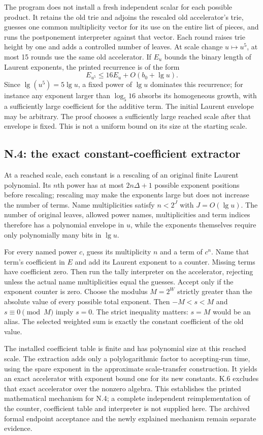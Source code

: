 \documentclass[11pt,letterpaper]{article}
\theoremstyle{definition}\newtheorem{definition}[theorem]{Definition}\newtheorem{example}[theorem]{Example}
\theoremstyle{remark}\newtheorem{remark}[theorem]{Remark}
\begin{document}
The program does not install a fresh independent scalar for each possible product. It retains the old trie and adjoins the rescaled old accelerator's trie, guesses one common multiplicity vector for its use on the entire list of pieces, and runs the postponement interpreter against that vector. Each round raises trie height by one and adds a controlled number of leaves. At scale change $u\mapsto u^5$, at most 15 rounds use the same old accelerator. If $E_u$ bounds the binary length of Laurent exponents, the printed recurrence is of the form
\[
 E_{u^5}\le16E_u+O(b_0+\lg u).
\]
Since $\lg(u^5)=5\lg u$, a fixed power of $\lg u$ dominates this recurrence; for instance any exponent larger than $\log_5 16$ absorbs its homogeneous growth, with a sufficiently large coefficient for the additive term. The initial Laurent envelope may be arbitrary. The proof chooses a sufficiently large reached scale after that envelope is fixed. This is not a uniform bound on its size at the starting scale.

\subsection{N.4: the exact constant-coefficient extractor}
At a reached scale, each constant is a rescaling of an original finite Laurent polynomial. Its $n$th power has at most $2n\Delta+1$ possible exponent positions before rescaling; rescaling may make the exponents large but does not increase the number of terms. Name multiplicities satisfy $n<2^J$ with $J=O(\lg u)$. The number of original leaves, allowed power names, multiplicities and term indices therefore has a polynomial envelope in $u$, while the exponents themselves require only polynomially many bits in $\lg u$.

For every named power $c$, guess its multiplicity $n$ and a term of $c^n$. Name that term's coefficient in $E$ and add its Laurent exponent to a counter. Missing terms have coefficient zero. Then run the tally interpreter on the accelerator, rejecting unless the actual name multiplicities equal the guesses. Accept only if the exponent counter is zero. Choose the modulus $M=2^W$ strictly greater than the absolute value of every possible total exponent. Then $-M<s<M$ and $s\equiv0\pmod M$ imply $s=0$. The strict inequality matters: $s=M$ would be an alias. The selected weighted sum is exactly the constant coefficient of the old value.

The installed coefficient table is finite and has polynomial size at this reached scale. The extraction adds only a polylogarithmic factor to accepting-run time, using the spare exponent in the approximate scale-transfer construction. It yields an exact accelerator with exponent bound one for its new constants. K.6 excludes that exact accelerator over the nonzero algebra. This establishes the printed mathematical mechanism for N.4; a complete independent reimplementation of the counter, coefficient table and interpreter is not supplied here. The archived formal endpoint acceptance and the newly explained mechanism remain separate evidence.
\end{document}
